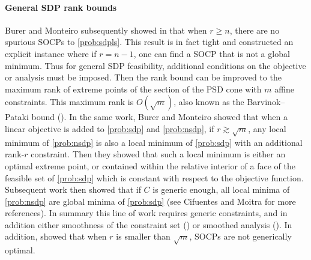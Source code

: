 \documentclass[final,onefignum,onetabnum]{siamart220329}
\begin{document}
\paragraph{General SDP rank bounds} Burer and Monteiro subsequently showed in
  \cite{BurerLocalMinimaConvergence2005} that when $r \ge n$, there are no
  spurious SOCPs to \eqref{prob:sdpls}. This result is in fact tight and
  \cite{bhojanapalli2018smoothed} constructed an explicit instance where if
  $r = n-1$, one can find a SOCP that is not a global minimum. Thus for general
  SDP feasibility, additional conditions on the objective or analysis must be
  imposed. Then the rank bound can be improved to the maximum rank of extreme
  points of the section of the PSD cone with $m$ affine constraints. This
  maximum rank is $O(\sqrt{m})$, also known as the Barvinok--Pataki bound
  (\cite{BarvinokRemarkRankPositive2001, PatakiRankExtremeMatrices1998}). In the
  same work, Burer and Monteiro \cite{BurerLocalMinimaConvergence2005} showed
  that when a linear objective is added to \eqref{prob:sdp} and \eqref{prob:nsdp},
  if $r \gtrsim \sqrt{m}$, any local minimum of \eqref{prob:nsdp} is also a local
  minimum of \eqref{prob:sdp} with an additional rank-$r$ constraint. Then they
  showed that such a local minimum is either an optimal extreme point, or
  contained within the relative interior of a face of the feasible set of
  \eqref{prob:sdp} which is constant with respect to the objective function.
  Subsequent work \cite{bhojanapalli2018smoothed} then showed that if $C$ is
  generic enough, all local minima of \eqref{prob:nsdp} are global minima of
  \eqref{prob:sdp} (see Cifuentes and Moitra
  \cite{CifuentesPolynomialtimeguarantees2019} for more references). In summary
  this line of work requires generic constraints, and in addition either
  smoothness of the constraint set (\cite{boumal2016nonconvex,
    boumal2020deterministic}) or smoothed analysis
  (\cite{bhojanapalli2018smoothed, CifuentesPolynomialtimeguarantees2019,
    cifuentes2021burer}). In addition, \cite{waldspurger2020rank} showed that
  when $r$ is smaller than $\sqrt{m}$, SOCPs are not generically optimal.
\end{document}
